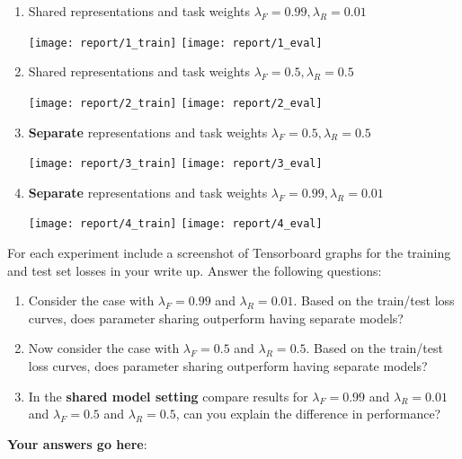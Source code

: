 \documentclass[12pt]{article}
\begin{document}
\begin{enumerate}
    \item Shared representations and task weights $\lambda_F=0.99, \lambda_R=0.01$

    \texttt{[image: report/1\_train]}
    \texttt{[image: report/1\_eval]}

    \item Shared representations and task weights $\lambda_F=0.5, \lambda_R=0.5$

    \texttt{[image: report/2\_train]}
    \texttt{[image: report/2\_eval]}

    \item \textbf{Separate} representations and task weights $\lambda_F=0.5, \lambda_R=0.5$

    \texttt{[image: report/3\_train]}
    \texttt{[image: report/3\_eval]}

    \item \textbf{Separate} representations and task weights  $\lambda_F=0.99, \lambda_R=0.01$

    \texttt{[image: report/4\_train]}
    \texttt{[image: report/4\_eval]}

\end{enumerate}
For each experiment include a screenshot of Tensorboard graphs for the training and test set losses in your write up. Answer the following questions:

\begin{enumerate}
    \item Consider the case with $\lambda_F=0.99$ and $\lambda_R=0.01$. Based on the train/test loss curves, does parameter sharing outperform having separate models? 
    
    \item Now consider the case with $\lambda_F=0.5$ and $\lambda_R=0.5$.  Based on the train/test loss curves, does parameter sharing outperform having separate models? 
    
    \item In the \textbf{shared model setting} compare results for $\lambda_F=0.99$ and $\lambda_R=0.01$ and $\lambda_F=0.5$ and $\lambda_R=0.5$, can you explain the difference in performance?
\end{enumerate}

\noindent\textbf{Your answers go here}:
\end{document}
